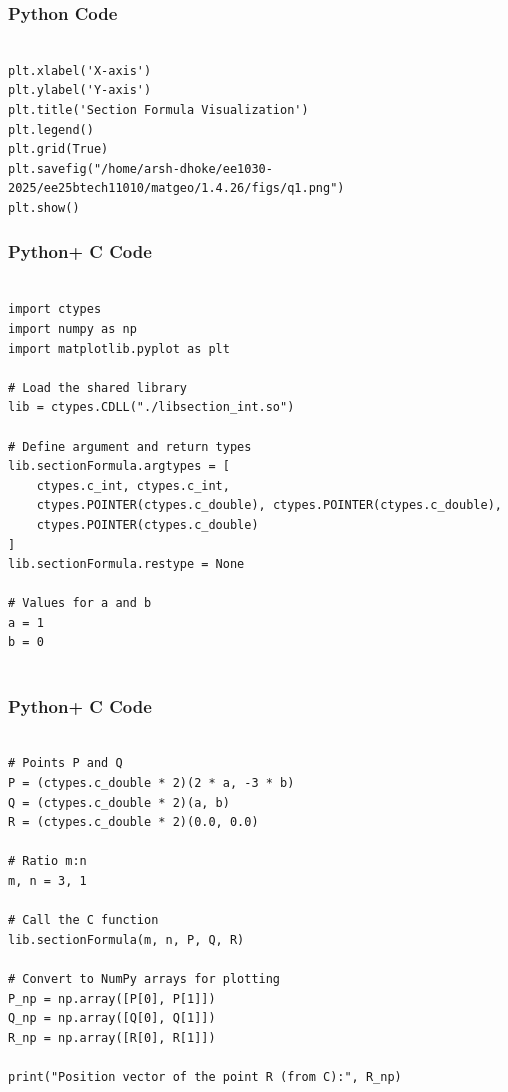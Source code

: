\documentclass{beamer}
\begin{document}
\begin{frame}[fragile]
    \frametitle{Python Code}

    \begin{lstlisting}

plt.xlabel('X-axis')
plt.ylabel('Y-axis')
plt.title('Section Formula Visualization')
plt.legend()
plt.grid(True)
plt.savefig("/home/arsh-dhoke/ee1030-2025/ee25btech11010/matgeo/1.4.26/figs/q1.png")
plt.show()

    \end{lstlisting}
\end{frame}

\begin{frame}[fragile]
    \frametitle{Python+ C Code}

    \begin{lstlisting}

import ctypes
import numpy as np
import matplotlib.pyplot as plt

# Load the shared library
lib = ctypes.CDLL("./libsection_int.so")

# Define argument and return types
lib.sectionFormula.argtypes = [
    ctypes.c_int, ctypes.c_int,
    ctypes.POINTER(ctypes.c_double), ctypes.POINTER(ctypes.c_double),
    ctypes.POINTER(ctypes.c_double)
]
lib.sectionFormula.restype = None

# Values for a and b
a = 1
b = 0


    \end{lstlisting}
\end{frame}

\begin{frame}[fragile]
    \frametitle{Python+ C Code}

    \begin{lstlisting}
    
# Points P and Q
P = (ctypes.c_double * 2)(2 * a, -3 * b)
Q = (ctypes.c_double * 2)(a, b)
R = (ctypes.c_double * 2)(0.0, 0.0)

# Ratio m:n
m, n = 3, 1

# Call the C function
lib.sectionFormula(m, n, P, Q, R)

# Convert to NumPy arrays for plotting
P_np = np.array([P[0], P[1]])
Q_np = np.array([Q[0], Q[1]])
R_np = np.array([R[0], R[1]])

print("Position vector of the point R (from C):", R_np)

  \end{lstlisting}
\end{frame}
\end{document}
